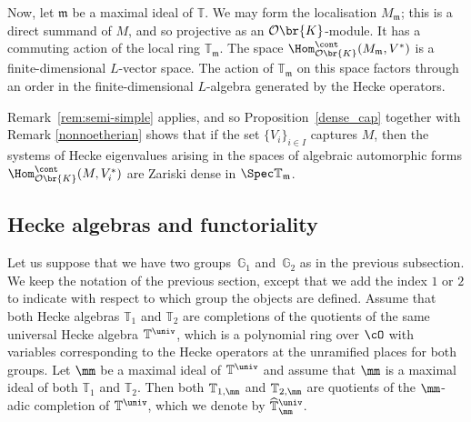 Now, let $\mathfrak m$ be a maximal ideal of $\mathbb T$.
We may form the localisation $M_{\mathfrak m}$; this is a direct
summand of $M$, and so projective as an $\mathcal O\br{K}$-module.
It has a commuting action of the local ring $\mathbb T_{\mathfrak m}$.
The space $\Hom_{\mathcal O\br{K}}^{\cont}(M_{\mathfrak m},V^*)$
is a finite-dimensional $L$\nobreakdash-vector space.
The action of $\mathbb T_{\mathfrak m}$ on this space
factors through an order in the finite-dimensional $L$-algebra
generated by the Hecke operators.

Remark~\ref{rem:semi-simple} applies, and so Proposition~\ref{dense_cap} together with Remark \ref{nonnoetherian}
shows that if the set $\{V_i\}_{i \in I}$ captures $M$,
then the systems of Hecke eigenvalues arising
in the spaces of algebraic automorphic forms
$\Hom_{\mathcal O\br{K}}^{\cont}(M,V_i^*)$
are Zariski dense in $\Spec \mathbb T_{\mathfrak m}$.

\subsection{Hecke algebras and functoriality} Let us suppose that we have two groups~$\mathbb G_1$ and~$\mathbb G_2$ as in the previous
subsection. We keep the notation of the previous section,
except that we add the index $1$ or $2$ to indicate with respect to which group the objects are defined. Assume that both Hecke algebras $\mathbb T_1$ and $\mathbb T_2$ are completions of the quotients
of the same universal Hecke algebra $\mathbb T^{\univ}$, which is a polynomial ring over
$\cO$ with variables corresponding to the Hecke operators at the unramified places for both groups.
Let $\mm$ be a maximal ideal of $\mathbb T^{\univ}$ and assume that $\mm$ is a maximal ideal of both $\mathbb T_1$ and $\mathbb T_2$. Then both $\mathbb T_{1,\mm}$ and $\mathbb T_{2,\mm}$ are quotients of the $\mm$-adic completion of $\mathbb T^{\univ}$, which we denote by $\widehat{\mathbb T}^{\univ}_{\mm}$.

